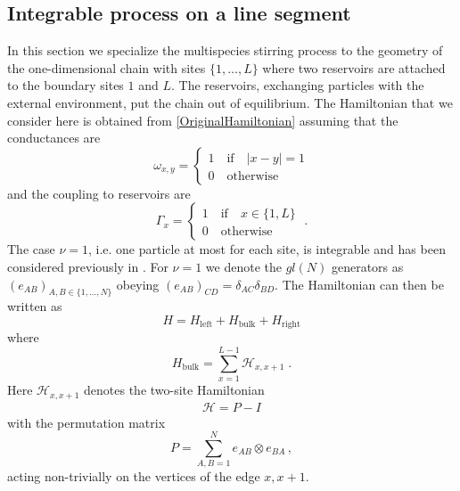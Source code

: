 \documentclass[10pt]{article}
\numberwithin{equation}{section}
\numberwithin{equation}{subsection}
\newcommand{\id}{I}
\newcommand{\dt}{\;.}
\begin{document}
\subsection{Integrable process on a line segment}\label{subsection-description-process-LINE}
In this section we specialize the multispecies stirring process to the geometry of the one-dimensional chain with sites $\{1,\ldots,L\}$ where two reservoirs are attached to the boundary sites $1$ and $L$.  The reservoirs, exchanging particles with the external environment, put the chain out of equilibrium.  The  Hamiltonian that we consider here is obtained from \eqref{OriginalHamiltonian} assuming that the conductances are
\begin{equation}
	\omega_{x,y}=\begin{cases}
		1 \quad \text{if}\quad |x-y|=1\\
		0\quad \text{otherwise}
	\end{cases}
\end{equation}
and the coupling to reservoirs are
\begin{equation}
	\Gamma_{x}=\begin{cases}
		1\quad \text{if} \quad x\in \{1,L\}\\
		0\quad \text{otherwise}
	\end{cases}\dt
\end{equation}
The case $\nu=1$, i.e. one particle at most for each site, is integrable and has been considered previously in \cite{vanicat2017exact}. 
For  $\nu=1$ we denote the ${gl}(N)$  generators   as  $(e_{AB})_{A,B\in\{1,\ldots,N\}}$ obeying $(e_{AB})_{CD}=\delta_{AC}\delta_{BD}$.
The Hamiltonian can then be written as
\begin{equation}\label{hamiltonian}
	H=H_{\text{left}}+H_{\text{bulk}}+H_{\text{right}}
\end{equation}
where
\begin{equation}
	H_{\text{bulk}}=\sum_{x=1}^{L-1}\mathcal{H}_{x,x+1}\dt
\end{equation}
Here $\mathcal{H}_{x,x+1}$  denotes  the two-site Hamiltonian 
\begin{equation}\label{H-corsivo}
	\begin{split}
		\mathcal{H}=P-\id
	\end{split}
\end{equation}
with the permutation matrix
\begin{equation}
	P=\sum_{A,B=1}^Ne_{AB}\otimes e_{BA}\,,
\end{equation} 
acting non-trivially on the vertices of the edge $x,x+1$.
\end{document}
